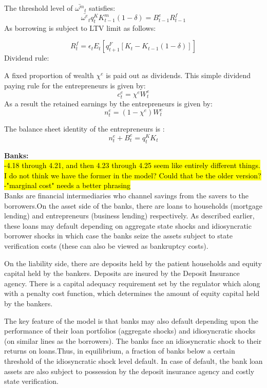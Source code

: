 \documentclass[12pt]{article}
\numberwithin{equation}{section}
\begin{document}
The threshold level of $\bar{\omega^m}_t$ satisfies:
\begin{equation}
\bar{\omega^e}_t q^K_{t} K^m_{t-1}(1-\delta) = B^e_{t-1}R^f_{t-1}
\end{equation}
As borrowing is subject to LTV limit as follows:

\begin{equation}
[B^e_t-B^e_{t-1}(1-rp)]R^f_{t} =\epsilon_{t} E_t[q^F_{t+1} [K_t-K_{t-1}(1-\delta)]]
\end{equation}
Dividend rule:

A fixed proportion of wealth $\chi^e$ is paid out as dividends. This simple dividend paying rule for the entrepreneurs is given by:
\begin{equation}
c^e_t=\chi^e W^e_t
\end{equation}
As a result the retained earnings by the entrepreneurs is given by:
\begin{equation}
n^e_t=(1-\chi^e) W^e_t
\end{equation}

The balance sheet identity of the entrepreneurs is :
\begin{equation}
n^e_t+B^e_t=q^K_t K_t
\end{equation}

\textbf{Banks:} \\
\hl{-4.18 through 4.21, and then 4.23 through 4.25 seem like entirely different things. I do not think we have the former in the model? Could that be the older version?\\
-"marginal cost" needs a better phrasing } \\

Banks are financial intermediaries who channel savings from the savers to the borrowers.On the asset side of the banks, there are loans to households (mortgage lending) and entrepreneurs (business lending) respectively. As described earlier, these loans may default depending on aggregate state shocks and idiosyncratic borrower shocks in which case the banks seize the assets subject to state verification costs (these can also be viewed as bankruptcy costs).

On the liability side, there are deposits held by the patient households and equity capital held by the bankers. Deposits are insured by the Deposit Insurance agency. There is a capital adequacy requirement set by the regulator which along with a penalty cost function, which determines the amount of equity capital held by the bankers.

The key feature of the model is that banks may also default depending upon the performance of their loan portfolios (aggregate shocks) and idiosyncratic shocks (on similar lines as  the borrowers). The banks face an idiosyncratic shock to their returns on loans.Thus, in equilibrium, a fraction of banks below a certain threshold of the idiosyncratic shock level default. In case of default, the bank loan assets are also subject to possession  by the deposit insurance agency and costly state verification.
\end{document}
